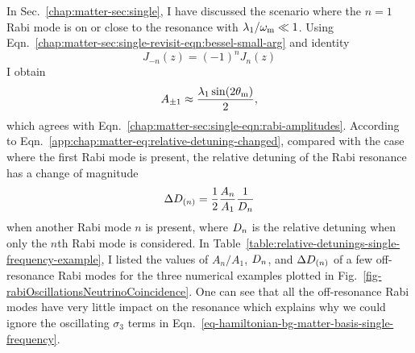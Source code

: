 In Sec.~\ref{chap:matter-sec:single}, I have discussed the scenario where the $n=1$ Rabi mode is on or close to the resonance with $\lambda_1/\omega_\mathrm m \ll 1$. Using Eqn.~\eqref{chap:matter-sec:single-revisit-eqn:bessel-small-arg} and identity
\begin{equation}
    J_{-n}(z) =(-1)^n J_{n}(z)
\end{equation}
I obtain
\begin{equation}
    A_{\pm 1} \approx \frac{ \lambda_1 \sin (2\theta_\mathrm m)}{2},
\end{equation}
which agrees with Eqn.~\eqref{chap:matter-sec:single-eqn:rabi-amplitudes}. According to Eqn.~\eqref{app:chap:matter-eq:relative-detuning-changed}, compared with the case where the first Rabi mode is present, the relative detuning of the Rabi resonance has a change of magnitude
\begin{equation}
\Delta D_{(n)} = \frac{1}{2} \frac{A_n}{A_1} \frac{1}{D_n}
\end{equation}
when another Rabi mode $n$ is present, where $D_n$ is the relative detuning when only the $n$th Rabi mode is considered. In Table~\ref{table:relative-detunings-single-frequency-example}, I listed the values of $A_n/A_1$, $D_n$, and $\Delta D_{(n)}$ of a few off-resonance Rabi modes for the three numerical examples plotted in Fig.~\ref{fig-rabiOscillationsNeutrinoCoincidence}. One can see that all the off-resonance Rabi modes have very little impact on the resonance which explains why we could ignore the oscillating $\sigma_3$ terms in Eqn.~\eqref{eq-hamiltonian-bg-matter-basis-single-frequency}.



